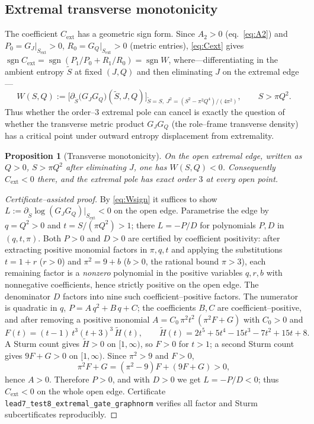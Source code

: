\documentclass[11pt]{article}
\newtheorem{proposition}[theorem]{Proposition}
\newcommand{\Rext}{C_{\mathrm{ext}}}
\newcommand{\Sext}{S_{\mathrm{ext}}}
\DeclareMathOperator{\sgn}{sgn}
\begin{document}
\subsection{Extremal transverse monotonicity}
\label{sec:gate}

The coefficient $\Rext$ has a geometric sign form. Since $A_2>0$ (eq.~\eqref{eq:A2}) and
$P_0=G_J|_{\Sext}>0$, $R_0=G_Q|_{\Sext}>0$ (metric entries), \eqref{eq:Cext} gives
$\sgn\Rext=\sgn(P_1/P_0+R_1/R_0)=\sgn W$, where---differentiating in the ambient entropy
$\tilde S$ at fixed $(J,Q)$ and then eliminating $J$ on the extremal edge---
\begin{equation}
W(S,Q):=\Big[\partial_{\tilde S}\big(G_JG_Q\big)(\tilde S,J,Q)\Big]_{\tilde S=S,\;
J^2=(S^2-\pi^2Q^4)/(4\pi^2)},\qquad S>\pi Q^2 .
\label{eq:Wsign}
\end{equation}
Thus whether the order--$3$ extremal pole can cancel is exactly the question of whether the
transverse metric product $G_JG_Q$ (the role--frame transverse density) has a critical point
under outward entropy displacement from extremality.

\begin{proposition}[Transverse monotonicity]
\label{prop:W}
On the open extremal edge, written as $Q>0$, $S>\pi Q^2$ after eliminating $J$, one has
$W(S,Q)<0$. Consequently $\Rext<0$ there, and the extremal pole has exact order $3$ at every
open point.
\end{proposition}

\begin{proof}[Certificate--assisted proof]
By \eqref{eq:Wsign} it suffices to show
$L:=\partial_{\tilde S}\log(G_JG_Q)\big|_{\Sext}<0$ on the open edge. Parametrise the edge by
$q=Q^2>0$ and $t=S/(\pi Q^2)>1$; there $L=-P/D$ for polynomials $P,D$ in $(q,t,\pi)$. Both
$P>0$ and $D>0$ are certified by coefficient positivity: after extracting positive monomial
factors in $\pi,q,t$ and applying the substitutions $t=1+r$ ($r>0$) and $\pi^2=9+b$ ($b>0$,
the rational bound $\pi>3$), each remaining factor is a \emph{nonzero} polynomial in the
positive variables $q,r,b$ with nonnegative coefficients, hence strictly positive on the open
edge. The denominator $D$ factors into nine such coefficient--positive factors. The numerator
is quadratic in $q$, $P=A\,q^2+B\,q+C$; the coefficients $B,C$ are coefficient--positive, and
after removing a positive monomial $A=C_0\,\pi^2t^2\,(\pi^2F+G)$ with $C_0>0$ and
\[
F(t)=(t-1)\,t^3(t+3)^3\,\widetilde H(t),\qquad
\widetilde H(t)=2t^5+5t^4-15t^3-7t^2+15t+8 .
\]
A Sturm count gives $\widetilde H>0$ on $[1,\infty)$, so $F>0$ for $t>1$; a second Sturm count
gives $9F+G>0$ on $[1,\infty)$. Since $\pi^2>9$ and $F>0$,
\[
\pi^2F+G=(\pi^2-9)F+(9F+G)>0,
\]
hence $A>0$. Therefore $P>0$, and with $D>0$ we get $L=-P/D<0$; thus $\Rext<0$ on the whole
open edge. Certificate \texttt{lead7\_test8\_extremal\_gate\_graphnorm} verifies all factor and
Sturm subcertificates reproducibly.
\end{proof}
\end{document}
